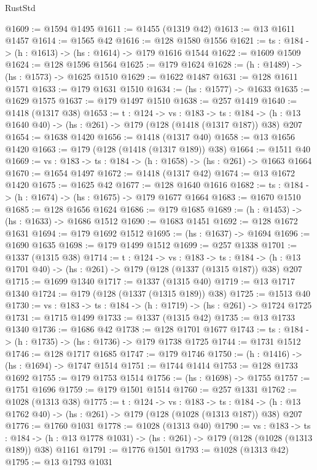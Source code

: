 \begin{lexlean}{RustStd}
\begin{coremodule}
@1609 := @1594 @1495
@1611 := @1455 (@1319 @42)
@1613 := @13 @1611 @1457
@1614 := @1565 @42
@1616 := @128 @1580 @1556
@1621 := {ts : @184} -> (h : @1613) -> (hs : @1614) -> @179 @1616 @1544
@1622 := @1609 @1509
@1624 := @128 @1596 @1564
@1625 := @179 @1624
@1628 := (h : @1489) -> (hs : @1573) -> @1625 @1510
@1629 := @1622 @1487
@1631 := @128 @1611 @1571
@1633 := @179 @1631 @1510
@1634 := (hs : @1577) -> @1633
@1635 := @1629 @1575
@1637 := @179 @1497 @1510
@1638 := @257 @1419
@1640 := @1418 (@1317 @38)
@1653 := {t : @124} ->
  {vs : @183} ->
  {ts : @184} -> (h : @13 @1640 @40) -> (hs : @261) -> @179 (@128 (@1418 (@1317 @187)) @38) @207
@1654 := @1638 @1420
@1656 := @1418 (@1317 @40)
@1658 := @13 @1656 @1420
@1663 := @179 (@128 (@1418 (@1317 @189)) @38)
@1664 := @1511 @40
@1669 := {vs : @183} -> {ts : @184} -> (h : @1658) -> (hs : @261) -> @1663 @1664
@1670 := @1654 @1497
@1672 := @1418 (@1317 @42)
@1674 := @13 @1672 @1420
@1675 := @1625 @42
@1677 := @128 @1640 @1616
@1682 := {ts : @184} -> (h : @1674) -> (hs : @1675) -> @179 @1677 @1664
@1683 := @1670 @1510
@1685 := @128 @1656 @1624
@1686 := @179 @1685
@1689 := (h : @1453) -> (hs : @1633) -> @1686 @1512
@1690 := @1683 @1451
@1692 := @128 @1672 @1631
@1694 := @179 @1692 @1512
@1695 := (hs : @1637) -> @1694
@1696 := @1690 @1635
@1698 := @179 @1499 @1512
@1699 := @257 @1338
@1701 := @1337 (@1315 @38)
@1714 := {t : @124} ->
  {vs : @183} ->
  {ts : @184} -> (h : @13 @1701 @40) -> (hs : @261) -> @179 (@128 (@1337 (@1315 @187)) @38) @207
@1715 := @1699 @1340
@1717 := @1337 (@1315 @40)
@1719 := @13 @1717 @1340
@1724 := @179 (@128 (@1337 (@1315 @189)) @38)
@1725 := @1513 @40
@1730 := {vs : @183} -> {ts : @184} -> (h : @1719) -> (hs : @261) -> @1724 @1725
@1731 := @1715 @1499
@1733 := @1337 (@1315 @42)
@1735 := @13 @1733 @1340
@1736 := @1686 @42
@1738 := @128 @1701 @1677
@1743 := {ts : @184} -> (h : @1735) -> (hs : @1736) -> @179 @1738 @1725
@1744 := @1731 @1512
@1746 := @128 @1717 @1685
@1747 := @179 @1746
@1750 := (h : @1416) -> (hs : @1694) -> @1747 @1514
@1751 := @1744 @1414
@1753 := @128 @1733 @1692
@1755 := @179 @1753 @1514
@1756 := (hs : @1698) -> @1755
@1757 := @1751 @1696
@1759 := @179 @1501 @1514
@1760 := @257 @1331
@1762 := @1028 (@1313 @38)
@1775 := {t : @124} ->
  {vs : @183} ->
  {ts : @184} -> (h : @13 @1762 @40) -> (hs : @261) -> @179 (@128 (@1028 (@1313 @187)) @38) @207
@1776 := @1760 @1031
@1778 := @1028 (@1313 @40)
@1790 := {vs : @183} ->
  {ts : @184} -> (h : @13 @1778 @1031) -> (hs : @261) -> @179 (@128 (@1028 (@1313 @189)) @38) @1161
@1791 := @1776 @1501
@1793 := @1028 (@1313 @42)
@1795 := @13 @1793 @1031

\end{coremodule}
\end{lexlean}
